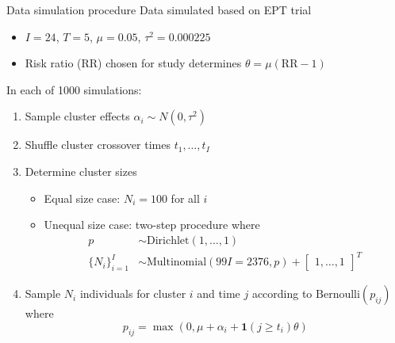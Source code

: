 \documentclass[9pt]{beamer}
\begin{document}
\begin{frame}{Data simulation procedure}
Data simulated based on EPT trial
\begin{itemize}

\item
$I=24$, $T=5$, $\mu=0.05$, $\tau^2=0.000225$

\item
Risk ratio (RR) chosen for study determines $\theta=\mu(\text{RR}-1)$

\end{itemize}
\vspace{2em}

In each of 1000 simulations:
\begin{enumerate}

\item
Sample cluster effects $\alpha_i\sim N(0,\tau^2)$

\item
Shuffle cluster crossover times $t_1,\ldots,t_I$

\item
Determine cluster sizes
\begin{itemize}
\item
Equal size case: $N_i=100$ for all $i$
\item
Unequal size case: two-step procedure where
\begin{align*}
p &\sim \text{Dirichlet}(1,\ldots,1) \\
\{N_i\}_{i=1}^I &\sim \text{Multinomial}(99I=2376,p) + \begin{bmatrix}1,\ldots,1\end{bmatrix}^T
\end{align*}
\end{itemize}

\item
Sample $N_i$ individuals for cluster $i$ and time $j$ according to $\text{Bernoulli}(p_{ij})$ where
\[
p_{ij} = \max(0,\mu+\alpha_i+\bm{1}(j\geq t_i)\theta)
\]

\end{enumerate}
\end{frame}
\end{document}
